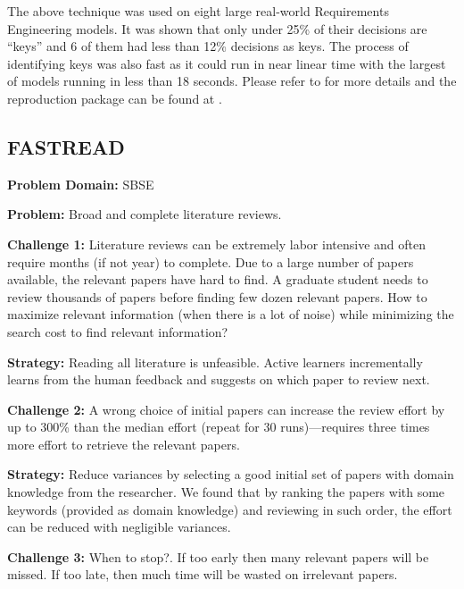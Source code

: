 \documentclass[sigconf,anonymous,review]{acmart}
\begin{document}
The above technique was used on eight large real-world Requirements Engineering models. It was shown that only under 25\% of their decisions are ``keys'' and 6 of them had less than 12\% decisions as keys. The process of identifying keys was also fast as it could run in near linear time with the largest of models running in less than 18 seconds. Please refer to \cite{mathew2017shorter} for more details and the reproduction package can be found at .

\subsection{FASTREAD}
\noindent\textbf{Problem Domain: } SBSE

\noindent\textbf{Problem: }
 Broad and complete literature reviews.
   
\vspace{1.0ex}
\noindent\textbf{Challenge 1: }
Literature reviews can be extremely labor intensive and often require months (if not year) to complete. Due to a large number of papers available, the relevant papers have hard to find. A graduate student needs to review thousands of papers before finding few dozen relevant papers.
How to maximize relevant information (when there is a lot of noise) while minimizing the search cost to find relevant information?

\noindent\textbf{Strategy: }
  Reading all   literature  is unfeasible. Active learners incrementally learns from the human feedback and suggests on which paper to review next.
   
\vspace{1.0ex}
\noindent\textbf{Challenge 2: }
A wrong choice of initial papers can increase the review effort by up to 300\% than the median effort (repeat for 30 runs)---requires three times more effort to retrieve the relevant papers. 

\noindent\textbf{Strategy: }
Reduce  variances  by selecting a good initial set of papers with domain knowledge from the researcher. We found that by ranking the papers with some  keywords (provided as domain knowledge) and reviewing in such order, the effort can be   reduced with negligible variances.
   
\vspace{1.0ex}
\noindent\textbf{Challenge 3: }
When to stop?. If too early then   many   relevant papers will be missed.
If too late, then much time will be wasted on irrelevant papers. 
\end{document}
